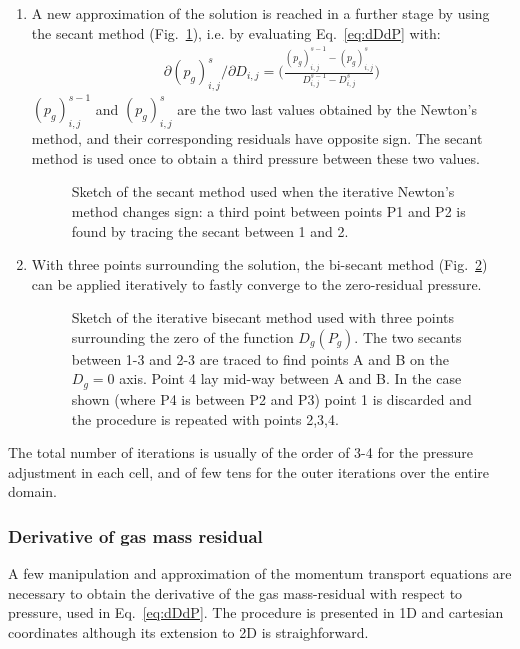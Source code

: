 \begin{enumerate}
%
\item A new approximation of the solution is reached in a further stage by using the 
secant method (Fig.~\ref{fig:secantm}), i.e. by evaluating Eq.~\ref{eq:dDdP} with:
%
\begin{eqnarray}
\partial (p_g)_{i,j}^{s} / \partial D_{i,j} = \bigg( \frac {(p_g)_{i,j}^{s-1} - (p_g)_{i,j}^{s}}
{D_{i,j}^{s-1} - D_{i,j}^{s}} \bigg)
\nonumber
\end{eqnarray}
%
$(p_g)_{i,j}^{s-1}$ and $(p_g)_{i,j}^{s}$ are the two last values obtained by the Newton's 
method, and their corresponding residuals have opposite sign. The secant method is used once 
to obtain a third pressure between these two values. 
%
\begin{figure}[h]
\centerline{}
\caption{\label{fig:secantm} Sketch of the secant method used when the iterative Newton's method
changes sign: a third point between points P1 and P2 is found by tracing the secant between 1 and 2.}
\end{figure}
%
\item With three points surrounding the solution, the bi-secant method (Fig.~\ref{fig:bisecantm}) 
can be applied iteratively to fastly converge to the zero-residual pressure.
%
\begin{figure}[h]
\centerline{}
\caption{\label{fig:bisecantm} Sketch of the iterative bisecant method used with three points surrounding
the zero of the function $D_g(P_g)$. The two secants between 1-3 and 2-3 are traced to find points
A and B on the $D_g=0$ axis. Point 4 lay mid-way between A and B. In the case shown (where P4 is 
between P2 and P3) point 1 is discarded and the procedure is repeated with points 2,3,4.}
\end{figure}
%
\end{enumerate}
%

The total number of iterations is usually of the order of 3-4 for the pressure adjustment
in each cell, and of few tens for the outer iterations over the entire domain.\\[5mm]
%
\clearpage
\subsubsection{Derivative of gas mass residual}
%
A few manipulation and approximation of the momentum transport equations are necessary
to obtain the derivative of the gas mass-residual with respect to pressure, used in 
Eq.~\ref{eq:dDdP}.
The procedure is presented in 1D and cartesian coordinates although its extension to 2D 
is straighforward.

